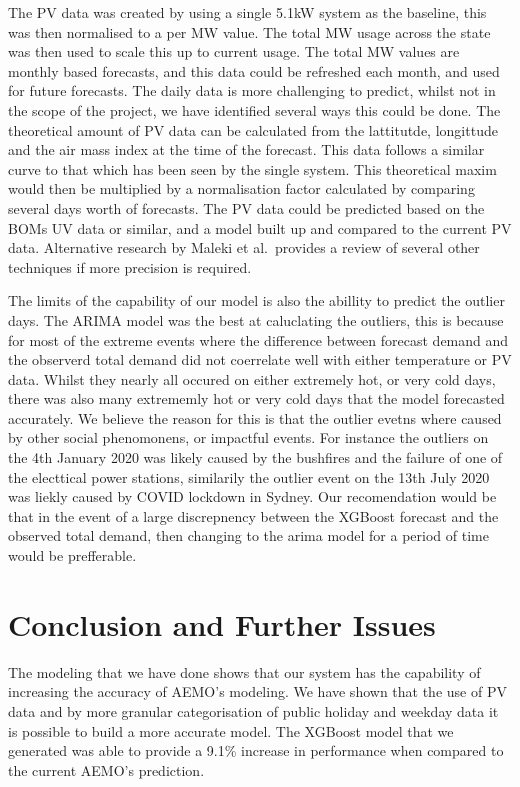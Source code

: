 \documentclass[mstat,12pt]{unswthesis}
\begin{document}
The PV data was created by using a single 5.1kW system as the baseline,
this was then normalised to a per MW value. The total MW usage across
the state was then used to scale this up to current usage. The total MW
values are monthly based forecasts, and this data could be refreshed
each month, and used for future forecasts. The daily data is more
challenging to predict, whilst not in the scope of the project, we have
identified several ways this could be done. The theoretical amount of PV
data can be calculated from the lattitutde, longittude and the air mass
index at the time of the forecast. This data follows a similar curve to
that which has been seen by the single system. This theoretical maxim
would then be multiplied by a normalisation factor calculated by
comparing several days worth of forecasts. The PV data could be
predicted based on the BOMs UV data or similar, and a model built up and
compared to the current PV data. Alternative research by Maleki et
al.~provides a review of several other techniques if more precision is
required\cite{en10010134}.

The limits of the capability of our model is also the abillity to
predict the outlier days. The ARIMA model was the best at caluclating
the outliers, this is because for most of the extreme events where the
difference between forecast demand and the observerd total demand did
not coerrelate well with either temperature or PV data. Whilst they
nearly all occured on either extremely hot, or very cold days, there was
also many extrememly hot or very cold days that the model forecasted
accurately. We believe the reason for this is that the outlier evetns
where caused by other social phenomonens, or impactful events. For
instance the outliers on the 4th January 2020 was likely caused by the
bushfires and the failure of one of the electtical power stations,
similarily the outlier event on the 13th July 2020 was liekly caused by
COVID lockdown in Sydney. Our recomendation would be that in the event
of a large discrepnency between the XGBoost forecast and the observed
total demand, then changing to the arima model for a period of time
would be prefferable.

\hypertarget{conclusion-and-further-issues}{%
\chapter{Conclusion and Further
Issues}\label{conclusion-and-further-issues}}

The modeling that we have done shows that our system has the capability
of increasing the accuracy of AEMO's modeling. We have shown that the
use of PV data and by more granular categorisation of public holiday and
weekday data it is possible to build a more accurate model. The XGBoost
model that we generated was able to provide a 9.1\% increase in
performance when compared to the current AEMO's prediction.
\end{document}
